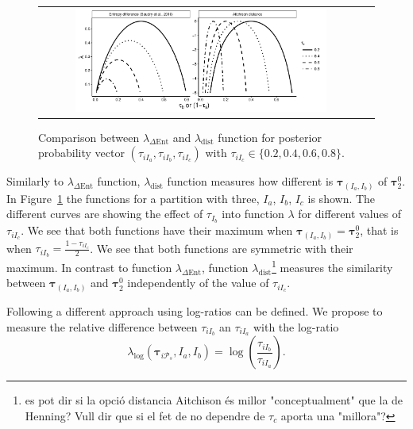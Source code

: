 \documentclass[submit]{smj}
\theoremstyle{definition}
\newcommand{\m}[1]{\boldsymbol{#1}}
\begin{document}
\begin{figure}[t]
\begin{center}
\begin{tabular}{cc}
  \includegraphics[width=0.8\textwidth]{figures/entr_dist.pdf} \\
 \end{tabular}
 \caption{Comparison between $\lambda_{\Delta\text{Ent}}$ and $\lambda_{\text{dist}}$ function for posterior probability 
vector $\left(\tau_{iI_a}, \tau_{iI_b}, \tau_{iI_c} \right)$ with $\tau_{iI_c} \in \{0.2, 0.4, 0.6, 0.8\}$.} 
\label{symetric}
\end{center}
\end{figure}

Similarly to $\lambda_{\Delta\text{Ent}}$ function, $\lambda_{\text{dist}}$ function measures how different is $\m\tau_{\left(I_a, I_b\right)}$ of $\m\tau_2^0$. In Figure~\ref{symetric} the functions for a partition with three, $I_a$, $I_b$, $I_c$ is shown. The different curves are showing the effect of $\tau_{I_b}$ into function $\lambda$ for different values of $\tau_{iI_c}$. We see that both functions have their maximum when $\m\tau_{\left(I_a, I_b\right)} = \m\tau_2^0$, that is when $\tau_{i I_b} = \frac{1-\tau_{i I_c}}{2}$. We see that both functions are symmetric with their maximum. In contrast to function $\lambda_{\Delta\text{Ent}}$, function $\lambda_{\text{dist}}$\footnote{es pot dir si la opció distancia Aitchison és millor "conceptualment" que la de Henning? Vull dir que si el fet de no dependre de $\tau_c$ aporta una "millora"?} measures the similarity between $\m\tau_{\left(I_a, I_b\right)}$ and $\m\tau_2^0$ independently of the value of $\tau_{i I_c}$.

Following \cite{longford2014} a different approach using log-ratios can be defined. We propose to measure the relative difference between $\tau_{iI_b}$ an $\tau_{iI_a}$ with the log-ratio
\[
\lambda_{\log}(\m\tau_{i \mathcal{P}_s},  I_a,  I_b) = \log \left(\frac{ \tau_{iI_b} }{ \tau_{iI_a} }\right).
\]
\end{document}
